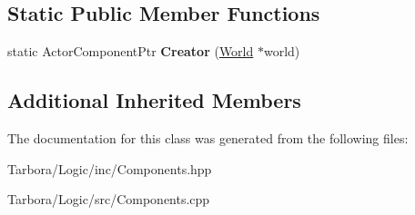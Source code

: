 \subsection*{Static Public Member Functions}
\begin{DoxyCompactItemize}
\item 
\mbox{\label{classTarbora_1_1ModelComponent_a1cda437d0a5771102c9d7402e77cc6de}} 
static Actor\+Component\+Ptr {\bfseries Creator} (\hyperlink{classTarbora_1_1World}{World} $\ast$world)
\end{DoxyCompactItemize}
\subsection*{Additional Inherited Members}


The documentation for this class was generated from the following files\+:\begin{DoxyCompactItemize}
\item 
Tarbora/\+Logic/inc/Components.\+hpp\item 
Tarbora/\+Logic/src/Components.\+cpp\end{DoxyCompactItemize}
